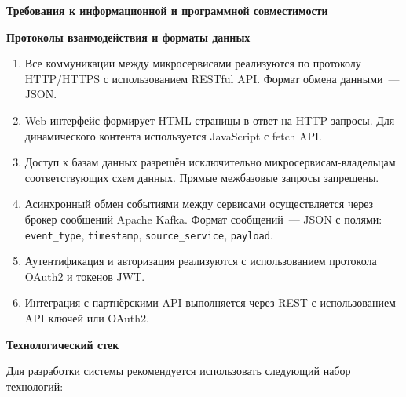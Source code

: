 \documentclass{bmstu}
\begin{document}
\begin{center}
    \textbf{Требования к информационной и программной совместимости}
\end{center}

\begin{center}
    \textbf{Протоколы взаимодействия и форматы данных}
\end{center}

\begin{enumerate}
    \item Все коммуникации между микросервисами реализуются по протоколу HTTP/HTTPS с использованием RESTful API. Формат обмена данными~--- JSON.
    
    \item Web-интерфейс формирует HTML-страницы в ответ на HTTP-запросы. Для динамического контента используется JavaScript с fetch API.
    
    \item Доступ к базам данных разрешён исключительно микросервисам-владельцам соответствующих схем данных. Прямые межбазовые запросы запрещены.
    
    \item Асинхронный обмен событиями между сервисами осуществляется через брокер сообщений Apache Kafka. Формат сообщений~--- JSON с полями: \texttt{event\_type}, \texttt{timestamp}, \texttt{source\_service}, \texttt{payload}.
    
    \item Аутентификация и авторизация реализуются с использованием протокола OAuth2 и токенов JWT.
    
    \item Интеграция с партнёрскими API выполняется через REST с использованием API ключей или OAuth2.
\end{enumerate}

\begin{center}
    \textbf{Технологический стек}
\end{center}

Для разработки системы рекомендуется использовать следующий набор технологий:
\end{document}
